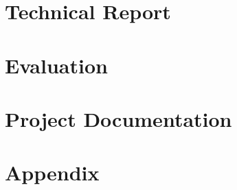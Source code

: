 







\pagestyle{scrheadings} %



\part{Technical Report} %



\part{Evaluation}

\part{Project Documentation}




\appendix
\part{Appendix} %



